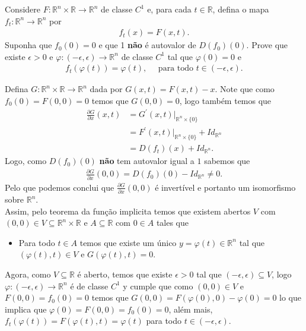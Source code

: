 \begin{homeworkProblem}[Seção 2-2]
  Considere $F:\mathbb{R}^{n}\times\mathbb{R}\to\mathbb{R}^{n}$ de classe $C^{1}$ e, para cada $t\in\mathbb{R}$, defina o mapa $f_t:\mathbb{R}^{n}\to\mathbb{R}^{n}$ por
  \begin{align*}
    f_{t}(x)=F(x,t).
  \end{align*}
  Suponha que $f_{0}(0)=0$ e que 1 \textbf{não} é autovalor de $D(f_{0})(0)$. Prove que existe $\epsilon>0$ e $\varphi:(-\epsilon,\epsilon)\to\mathbb{R}^{n}$ de classe $C^{1}$ tal que $\varphi(0)=0$ e
  \begin{align*}
    f_{t}(\varphi(t))=\varphi(t),\quad\text{ para todo }t\in(-\epsilon,\epsilon).
  \end{align*}
  \begin{solution}
    Defina $G:\mathbb{R}^{n}\times\mathbb{R}\to\mathbb{R}^{n}$ dada por $G(x,t)=F(x,t)-x$. Note que como $f_{0}(0)=F(0,0)=0$ temos que $G(0,0)=0$, logo também temos que
    \begin{align*}
      \frac{\partial G}{\partial x}(x,t)&=G^{\prime}(x,t)\big|_{\mathbb{R}^{n}\times\{0\}}\\
      &=F^{\prime}(x,t)\big|_{\mathbb{R}^{n}\times\{0\}}+Id_{\mathbb{R}^{n}}\\
      &=D(f_{t})(x)+Id_{\mathbb{R}^{n}}.
    \end{align*} 
    Logo, como $D(f_{0})(0)$ \textbf{não} tem autovalor igual a $1$ sabemos que
    \begin{align*}
      \frac{\partial G}{\partial x}(0,0)=D(f_{0})(0)-Id_{\mathbb{R}^{n}}\neq 0.
    \end{align*}
    Pelo que podemos conclui que $\frac{\partial G}{\partial x}(0,0)$ é invertível e portanto um isomorfismo sobre $\mathbb{R}^{n}$.\\
    Assim, pelo teorema da função implicita temos que existem abertos $V$ com $(0,0)\in V\subseteq \mathbb{R}^{n}\times\mathbb{R}$ e $A\subseteq \mathbb{R}$ com $0\in A$ tales que
    \begin{itemize}
      \item Para todo $t\in A$ temos que existe um único $y=\varphi(t)\in\mathbb{R}^{n}$ tal que $(\varphi(t),t)\in V$ e $G(\varphi(t),t)=0$. 
    \end{itemize}
    Agora, como $V\subseteq \mathbb{R}$ é aberto, temos que existe $\epsilon>0$ tal que $(-\epsilon,\epsilon)\subseteq V$, logo $\varphi:(-\epsilon,\epsilon)\to\mathbb{R}^{n}$ é de classe $C^1$ y cumple que como $(0,0)\in V$ e $F(0,0)=f_{0}(0)=0$ temos que $G(0,0)=F(\varphi(0),0)-\varphi(0)=0$ lo que implica que $\varphi(0)=F(0,0)=f_{0}(0)=0$, além mais, $f_{t}(\varphi(t))=F(\varphi(t),t)=\varphi(t)$ para todo $t\in(-\epsilon,\epsilon)$. 
  \end{solution}
\end{homeworkProblem}
